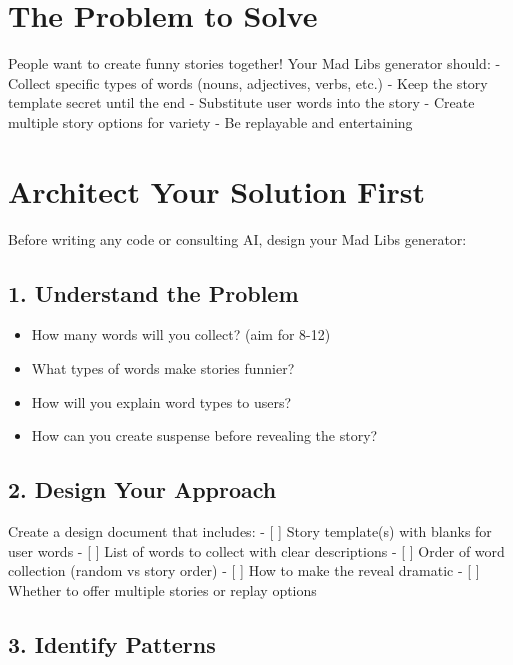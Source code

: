\documentclass[
  letterpaper,
  DIV=11,
  numbers=noendperiod,
  oneside]{scrreprt}
\providecommand{\tightlist}{%
  \setlength{\itemsep}{0pt}\setlength{\parskip}{0pt}}\usepackage{longtable,booktabs,array}
\begin{document}
\section{The Problem to Solve}\label{the-problem-to-solve-1}

People want to create funny stories together! Your Mad Libs generator
should: - Collect specific types of words (nouns, adjectives, verbs,
etc.) - Keep the story template secret until the end - Substitute user
words into the story - Create multiple story options for variety - Be
replayable and entertaining

\section{Architect Your Solution
First}\label{architect-your-solution-first-1}

Before writing any code or consulting AI, design your Mad Libs
generator:

\subsection{1. Understand the Problem}\label{understand-the-problem-1}

\begin{itemize}
\tightlist
\item
  How many words will you collect? (aim for 8-12)
\item
  What types of words make stories funnier?
\item
  How will you explain word types to users?
\item
  How can you create suspense before revealing the story?
\end{itemize}

\subsection{2. Design Your Approach}\label{design-your-approach-1}

Create a design document that includes: - {[} {]} Story template(s) with
blanks for user words - {[} {]} List of words to collect with clear
descriptions - {[} {]} Order of word collection (random vs story order)
- {[} {]} How to make the reveal dramatic - {[} {]} Whether to offer
multiple stories or replay options

\subsection{3. Identify Patterns}\label{identify-patterns-1}
\end{document}
